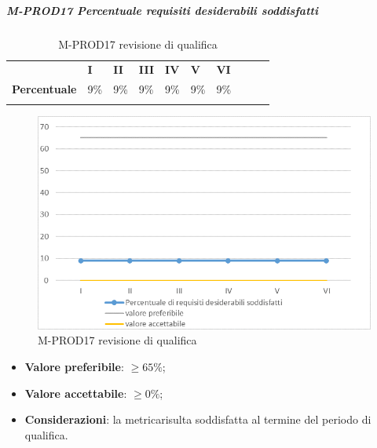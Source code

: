 \subparagraph{M-PROD17 Percentuale requisiti desiderabili soddisfatti} \mbox{}
\begin{longtable}[H!] {						
		>{}p{50mm}  		
		>{}p{8mm}
		>{}p{8mm}		
		>{}p{8mm}		
		>{}p{8mm}		
		>{}p{8mm}		
		>{}p{8mm}
		>{}p{8mm}
		>{}p{8mm}
		>{}p{8mm}
	}
	\rowcolor{gray!50}
	\textbf{} & \textbf{I} & \textbf{II} & \textbf{III} & \textbf{IV} & \textbf{V} & \textbf{VI} \TBstrut \\ [2mm]
	\textbf{Percentuale} & 9\% & 9\% & 9\% & 9\% & 9\% & 9\% \TBstrut \\ [2mm]
	\rowcolor{white}
	\caption{M-PROD17 revisione di qualifica}
\end{longtable}
\begin{figure}[H] 	
	\includegraphics[width=\linewidth]{./img/grafici/RQ17.png}	
	\caption{M-PROD17 revisione di qualifica}	
\end{figure}
\begin{itemize}
	\item \textbf{Valore preferibile}: $\ge 65\%$;
	\item \textbf{Valore accettabile}: $\ge 0\%$;
	\item \textbf{Considerazioni}: la metrica\glosp risulta soddisfatta al termine del periodo di qualifica.
\end{itemize}

